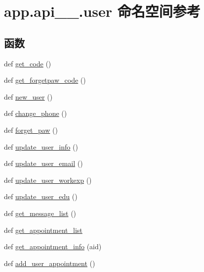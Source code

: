 \hypertarget{namespaceapp_1_1api__1__0_1_1user}{}\section{app.\+api\+\_\+\_.\+user 命名空间参考}
\label{namespaceapp_1_1api__1__0_1_1user}
\subsection*{函数}
\begin{DoxyCompactItemize}
\item 
def \hyperlink{namespaceapp_1_1api__1__0_1_1user_aaa1dafab3a77326e0392cf339082e647}{get\+\_\+code} ()
\item 
def \hyperlink{namespaceapp_1_1api__1__0_1_1user_a89da7a6daeb2bfdcd45923e7b843f546}{get\+\_\+forgetpaw\+\_\+code} ()
\item 
def \hyperlink{namespaceapp_1_1api__1__0_1_1user_a55691ec00cfa22b8722440ac1c0e5488}{new\+\_\+user} ()
\item 
def \hyperlink{namespaceapp_1_1api__1__0_1_1user_a3decbd5fa1b9c12c3c07f4fd24c9334d}{change\+\_\+phone} ()
\item 
def \hyperlink{namespaceapp_1_1api__1__0_1_1user_a7247bd481a00327ab66b7f28009b694b}{forget\+\_\+paw} ()
\item 
def \hyperlink{namespaceapp_1_1api__1__0_1_1user_a112fe5de3606f23f630ad74b003c3793}{update\+\_\+user\+\_\+info} ()
\item 
def \hyperlink{namespaceapp_1_1api__1__0_1_1user_a9b41580209128354ab384a4383ed8473}{update\+\_\+user\+\_\+email} ()
\item 
def \hyperlink{namespaceapp_1_1api__1__0_1_1user_a0bfdfa2ffc75a64ccceb916fecf3ca4e}{update\+\_\+user\+\_\+workexp} ()
\item 
def \hyperlink{namespaceapp_1_1api__1__0_1_1user_a8717211160238bc1ebc8017125817a3b}{update\+\_\+user\+\_\+edu} ()
\item 
def \hyperlink{namespaceapp_1_1api__1__0_1_1user_adbf0ca572c456c2672a365934ab044b2}{get\+\_\+message\+\_\+list} ()
\item 
def \hyperlink{namespaceapp_1_1api__1__0_1_1user_ac5e8e848c1b276331fd4973c7cceebc0}{get\+\_\+appointment\+\_\+list}
\item 
def \hyperlink{namespaceapp_1_1api__1__0_1_1user_ab0c62b12dafc69ab2f3e365de39a56ba}{get\+\_\+appointment\+\_\+info} (aid)
\item 
def \hyperlink{namespaceapp_1_1api__1__0_1_1user_ad6c1e946dc1153f1dbc267d309135dea}{add\+\_\+user\+\_\+appointment} ()

\end{DoxyCompactItemize}
